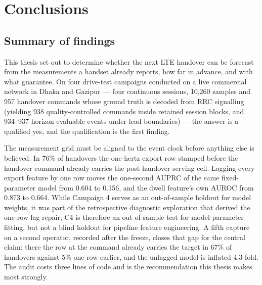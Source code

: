 \chapter{Conclusions}\label{ch:7}


\section{Summary of findings}
\label{sec:7_1}

This thesis set out to determine whether the next LTE handover can be forecast from the measurements a handset already reports, how far in advance, and with what guarantee. On four drive-test campaigns conducted on a live commercial network in Dhaka and Gazipur --- four continuous sessions, 10,260 samples and 957 handover commands whose ground truth is decoded from RRC signalling (yielding 938 quality-controlled commands inside retained session blocks, and 934--937 horizon-evaluable events under lead boundaries) --- the answer is a qualified yes, and the qualification is the first finding.

The measurement grid must be aligned to the event clock before anything else is believed. In 76\% of handovers the one-hertz export row stamped before the handover command already carries the post-handover serving cell. Lagging every export feature by one row moves the one-second AUPRC of the same fixed-parameter model from 0.604 to 0.156, and the dwell feature's own AUROC from 0.873 to 0.664. While Campaign 4 serves as an out-of-sample holdout for model weights, it was part of the retrospective diagnostic exploration that derived the one-row lag repair; C4 is therefore an out-of-sample test for model parameter fitting, but not a blind holdout for pipeline feature engineering. A fifth capture on a second operator, recorded after the freeze, closes that gap for the central claim: there the row at the command already carries the target in 67\% of handovers against 5\% one row earlier, and the unlagged model is inflated 4.3-fold. The audit costs three lines of code and is the recommendation this thesis makes most strongly.

